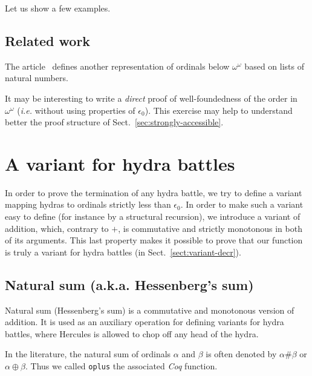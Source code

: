 
    Let us show a few examples.
    



    \subsection{Related work}
    The article~\cite{Manoury2016}  defines another representation of ordinals below $\omega^\omega$ based on lists of natural numbers.


    
\begin{exercise}
  It may be interesting to write a \emph{direct} proof  of well-foundedness of the order in $\omega^\omega$ (\emph{i.e.}
  without using properties of $\epsilon_0$). This exercise may
  help to understand better the proof structure of Sect.~\vref{sec:strongly-accessible}.
    \end{exercise}
    \section{A variant for hydra battles}

    In order to prove the termination of any hydra battle, we try to define a variant mapping hydras to ordinals strictly less than $\epsilon_0$.
    In order to make such a variant easy to define (for instance by a structural recursion), we introduce a variant of addition, which, contrary to
    $+$, is commutative and strictly monotonous in both of its arguments. This last property makes it possible to prove that our function is 
    truly a variant for hydra battles (in Sect.~\vref{sect:variant-decr}).

    \subsection{Natural sum (a.k.a. Hessenberg's  sum)}
    \label{sec:orgheadline87}
    \label{hydra-variant}
    \label{sect:hessenberg-def}
    
    Natural sum (Hessenberg's  sum) is a commutative and monotonous version of
    addition. It is used as an auxiliary operation  for defining variants
    for hydra battles, where Hercules is allowed to chop off any  head of the hydra.

    In the literature, the natural sum of ordinals \(\alpha\) and \(\beta\)
    is often denoted by \(\alpha \# \beta\)  or  \(\alpha \oplus  \beta\).
    Thus we called \texttt{oplus} the associated \emph{Coq} function.

